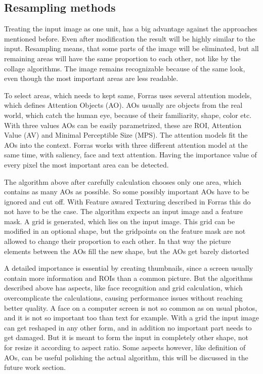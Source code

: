 \documentclass[draft,final]{vutinfth} %
\begin{document}
\subsection{Resampling methods}
Treating the input image as one unit, has a big advantage against the approaches mentioned before.
Even after modification the result will be highly similar to the input.
Resampling means, that some parts of the image will be eliminated, but all remaining areas will have the same proportion to each other, not like by the collage algorithms.
The image remains recognizable because of the same look, even though the most important areas are less readable.\par 
To select areas, which needs to kept same, Forras uses several attention models, which defines Attention Objects (AO).
AOs usually are objects from the real world, which catch the human eye, because of their familiarity, shape, color etc.
With three values AOs can be easily parametrized, these are ROI, Attention Value (AV) and Minimal Perceptible Size (MPS).
The attention models fit the AOs into the context.
Forras works with three different attention model at the same time, with saliency, face and text attention.
Having the importance value of every pixel the most important area can be detected.\par 
The algorithm above after carefully calculation chooses only one area, which contains as many AOs as possible.
So some possibly important AOs have to be ignored and cut off.
With Feature awared Texturing described in Forras this do not have to be the case.
The algorithm expects an input image and a feature mask.
A grid is generated, which lies on the input image.
This grid can be modified in an optional shape, but the gridpoints on the feature mask are not allowed to change their proportion to each other.
In that way the picture elements between the AOs fill the new shape, but the AOs get barely distorted\par 
A detailed importance is essential by creating thumbnails, since a screen usually contain more information and ROIs than a common picture. 
But the algorithms described above has aspects, like face recognition and grid calculation, which overcomplicate the calculations, causing performance issues without reaching better quality.
A face on a computer screen is not so common as on usual photos, and it is not so important too than text for example.
With a grid the input image can get reshaped in any other form, and in addition no important part needs to get damaged.
But it is meant to form the input in completely other shape, not for resize it according to aspect ratio.
Some aspects however, like definition of AOs, can be useful polishing the actual algorithm, this will be discussed in the future work section.
\end{document}
